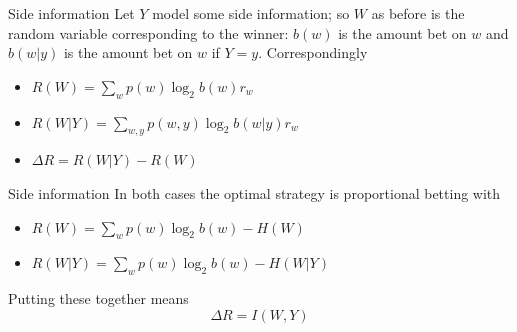 \documentclass{beamer}
\newcommand{\crish}{\color{reddish}}
\newcommand{\cbla}{\color{black}}
\begin{document}
\begin{frame}{Side information}
  Let \crish$Y$\cbla{}  model some side information; so \crish$W$\cbla{}  as before is the random variable corresponding to the winner: \crish$b(w)$\cbla{} is the amount bet on \crish$w$\cbla{} and \crish$b(w|y)$\cbla{} is the amount bet on \crish$w$\cbla{} if \crish$Y=y$\cbla{}. Correspondingly
\begin{itemize}
\item \crish$R(W)= \sum_w{p(w)\log_2{b(w)r_w}}$\cbla{}
\item \crish$R(W|Y)= \sum_{w,y}{p(w,y)\log_2{b(w|y)r_w}}$\cbla{} 
\item \crish$\Delta R=R(W|Y)-R(W)$\cbla{} 
\end{itemize}
\end{frame}


\begin{frame}{Side information}
In both cases the optimal strategy is proportional betting with
\begin{itemize}
\item \crish$R(W)= \sum_w{p(w)\log_2{b(w)}}-H(W)$\cbla{}
\item \crish$R(W|Y)= \sum_w{p(w)\log_2{b(w)}}-H(W|Y)$\cbla{} 
\end{itemize}
Putting these together means
\crish$$
\Delta R=I(W,Y)
$$\cbla{}
\end{frame}
\end{document}
